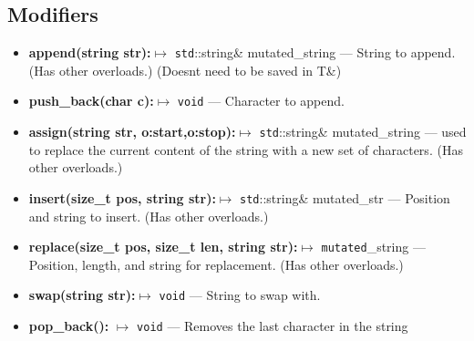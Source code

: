 \documentclass{report}
\begin{document}
    \subsection{Modifiers}
    \begin{itemize}
        \item \textbf{append(string str):}$\mapsto$ \texttt{std}::string\& mutated\_string --- String to append. (Has other overloads.) (Doesnt need to be saved in T\&)
        \item \textbf{push\_back(char c):}$\mapsto$ \texttt{void} --- Character to append.
        \item \textbf{assign(string str, o:start,o:stop):}$\mapsto$ \texttt{std}::string\& mutated\_string  --- used to replace the current content of the string with a new set of characters. (Has other overloads.)
        \item \textbf{insert(size\_t pos, string str):}$\mapsto$ \texttt{std}::string\& mutated\_str --- Position and string to insert. (Has other overloads.)
        \item \textbf{replace(size\_t pos, size\_t len, string str):}$\mapsto $ \texttt{mutated}\_string --- Position, length, and string for replacement. (Has other overloads.)
        \item \textbf{swap(string str):}$\mapsto$ \texttt{void} --- String to swap with.
        \item \textbf{pop\_back():} $\mapsto$ \texttt{void} --- Removes the last character in the string
    \end{itemize}

    \pagebreak \bigbreak \noindent 
\end{document}
